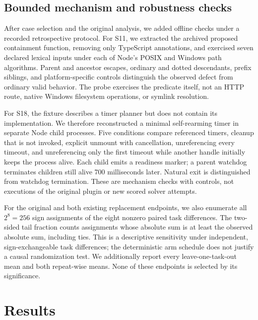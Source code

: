 \documentclass[11pt]{article}
\begin{document}
\subsection{Bounded mechanism and robustness checks}\label{sec:mechanisms}
After case selection and the original analysis, we added offline checks under a recorded retrospective protocol. For S11, we extracted the archived proposed containment function, removing only TypeScript annotations, and exercised seven declared lexical inputs under each of Node's POSIX and Windows path algorithms. Parent and ancestor escapes, ordinary and dotted descendants, prefix siblings, and platform-specific controls distinguish the observed defect from ordinary valid behavior. The probe exercises the predicate itself, not an HTTP route, native Windows filesystem operations, or symlink resolution.

For S18, the fixture describes a timer planner but does not contain its implementation. We therefore reconstructed a minimal self-rearming timer in separate Node child processes. Five conditions compare referenced timers, cleanup that is not invoked, explicit unmount with cancellation, unreferencing every timeout, and unreferencing only the first timeout while another handle initially keeps the process alive. Each child emits a readiness marker; a parent watchdog terminates children still alive 700 milliseconds later. Natural exit is distinguished from watchdog termination. These are mechanism checks with controls, not executions of the original plugin or new scored solver attempts.

For the original and both existing replacement endpoints, we also enumerate all $2^8=256$ sign assignments of the eight nonzero paired task differences. The two-sided tail fraction counts assignments whose absolute sum is at least the observed absolute sum, including ties. This is a descriptive sensitivity under independent, sign-exchangeable task differences; the deterministic arm schedule does not justify a causal randomization test. We additionally report every leave-one-task-out mean and both repeat-wise means. None of these endpoints is selected by its significance.

\section{Results}
\end{document}
